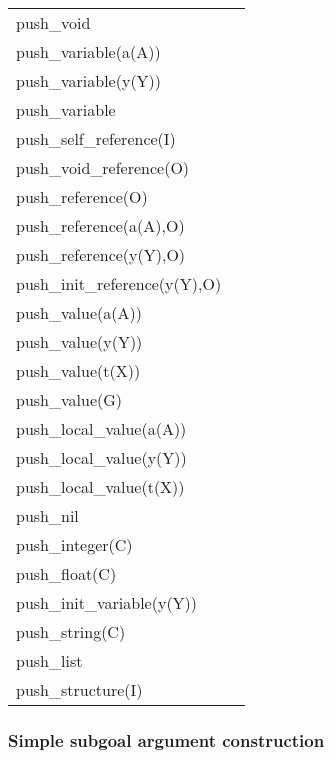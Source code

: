 \begin{tabular}{|l|l|}
\hline
push_void                       &         \\
push_variable(a(A))             &                 \\
push_variable(y(Y))             &                 \\
push_variable                   &         \\
push_self_reference(I)          &                 \\
push_void_reference(O)          &                 \\
push_reference(O)               &                 \\
push_reference(a(A),O)          &                 \\
push_reference(y(Y),O)          &                 \\
push_init_reference(y(Y),O)     &                 \\
push_value(a(A))                &                 \\
push_value(y(Y))                &                 \\
push_value(t(X))                &                 \\
push_value(G)                   &         \\
push_local_value(a(A))          &                 \\
push_local_value(y(Y))          &                 \\
push_local_value(t(X))          &                 \\
push_nil                        &         \\
push_integer(C)                 &         \\
push_float(C)                   &         \\
push_init_variable(y(Y))        &                         \\
push_string(C)                  &         \\
push_list                       &         \\
push_structure(I)               &                 \\
\hline
\end{tabular}

\subsubsection{Simple subgoal argument construction}


